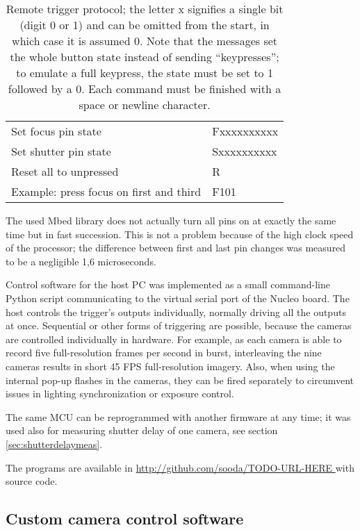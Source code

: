 \begin{table}[h]
	\centering
	\begin{tabular}{l l}
		Set focus pin state & Fxxxxxxxxxx\\
		Set shutter pin state & Sxxxxxxxxxx\\
		Reset all to unpressed & R\\
		Example: press focus on first and third & F101\\
	\end{tabular}
	\caption{
		Remote trigger protocol; the letter x signifies a single bit (digit 0 or 1) and can be omitted from the start, in which case it is assumed 0.
		Note that the messages set the whole button state instead of sending ``keypresses'';
		to emulate a full keypress, the state must be set to 1 followed by a 0.
		Each command must be finished with a space or newline character.
	}
	\label{tab:triggerprotocol}
\end{table}

The used Mbed library does not actually turn all pins on at exactly the same time but in fast succession.
This is not a problem because of the high clock speed of the processor;
the difference between first and last pin changes was measured to be a negligible 1,6 microseconds.

Control software for the host PC was implemented as a small command-line Python script communicating to the virtual serial port of the Nucleo board.
The host controls the trigger's outputs individually, normally driving all the outputs at once.
Sequential or other forms of triggering are possible, because the cameras are controlled individually in hardware.
For example, as each camera is able to record five full-resolution frames per second in burst, interleaving the nine cameras results in short 45 FPS full-resolution imagery.
Also, when using the internal pop-up flashes in the cameras, they can be fired separately to circumvent issues in lighting synchronization or exposure control.

The same MCU can be reprogrammed with another firmware at any time; it was used also for measuring shutter delay of one camera, see section \ref{sec:shutterdelaymeas}.

The programs are available in \url { http://github.com/sooda/TODO-URL-HERE } with source code.


\subsection{Custom camera control software} %

